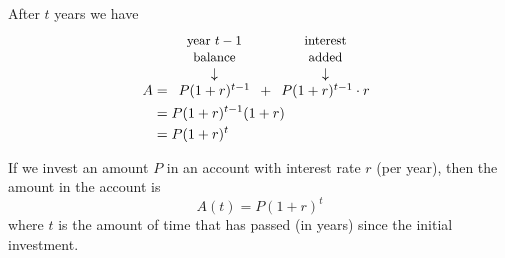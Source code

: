 After $t$ years we have
\begin{align*}
	A & = \begin{array}[b]{c} 
	$\small year $ t-1 \\
	$\small balance$\\
	\downarrow\\
	P(1+r)^{t-1}
	\end{array}
	+  
	\begin{array}[b]{c}
	$\small interest$ \\
	$\small added$\\
	\downarrow \\
	P(1+r)^{t-1}\cdot r \\
	\end{array}\\
	  & = P(1+r)^{t-1}(1+r)   \\    
	  & = P(1+r)^t            
\end{align*}
			
\begin{pccdefinition}
	If we invest an amount $P$ in an account with interest rate $r$ (per year), then 
	the amount in the account is
	\begin{equation}\label{exp:eq:simpleinterest}
		A(t)=P(1+r)^t
	\end{equation}
	where $t$ is the amount of time that has passed (in years) since the initial 
	investment.
\end{pccdefinition}
			
